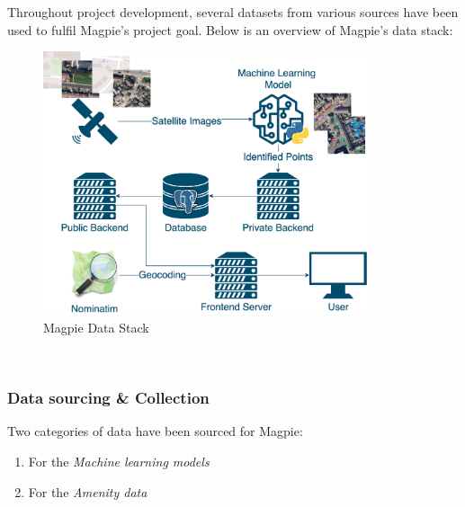 Throughout project development, several datasets from various sources have been used to fulfil Magpie's project goal. Below is an overview of Magpie's data stack:
\begin{figure}[h!]
    \centering
    \includegraphics[width=0.85\textwidth]{images/magpie-data-stack.png}
    \caption{Magpie Data Stack}
\end{figure}\\

\subsubsection{Data sourcing \& Collection}
Two categories of data have been sourced for Magpie:
\begin{enumerate}
    \item For the \emph{Machine learning models}
    \item For the \emph{Amenity data}
\end{enumerate}

